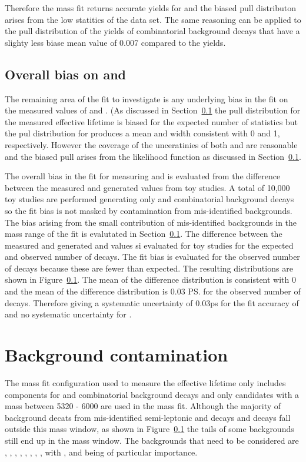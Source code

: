Therefore the mass fit returns accurate yields for \bsmumu and the biased pull distributon arises from the low statitics of the data set. The same reasoning can be applied to the pull distribution of the yields of combinatorial background decays that have a slighty less biase mean value of 0.007 compared to the \bsmumu yields.

\subsection{Overall bias on \tmumu and \Gmumu}
The remaining area of the fit to investigate is any underlying bias in the fit on the measured values of \tmumu and \Gmumu. (As discussed in Section~\ref{} the pull distribution for the measured effective lifetime is biased for the expected number of statistics but the pul distribution for \Gmumu produces a mean and width consistent with 0 and 1, respectively. However the coverage of the unceratinies of both \mmumu and \Gmumu are reasonable and the biased \tmumu pull arises from the likelihood function as discussed in Section~\ref{}. 

The overall bias in the fit for measuring \tmumu and \Gmumu is evaluated from the difference between the measured and generated values from toy studies. A total of 10,000 toy studies are performed generating only \bsmumu and combinatorial background decays so the fit bias is not masked by contamination from mis-identified backgrounds.  The bias arising from the small contribution of mis-identified backgrounds in the mass range of the fit is evalutated in Section~\ref{}. The difference between the measured and generated \tmumu and \Gmumu values si evaluated for toy studies for the expected and observed number of \bsmumu decays. The fit bias is evaluated for the observed number of decays because these are fewer than expected. The resulting distributions are shown in Figure~\ref{}. The mean of the \Gmumu difference distribution is consistent with 0 and the mean of the \tmumu difference distribution is 0.03 \ps for the observed number of decays.  Therefore giving a systematic uncertainty of 0.03ps for the fit accuracy of \tmumu and no systematic uncertainty for \Gmumu.

\section{Background contamination}
\label{sec:BKGcontaim}
The mass fit configuration used to measure the \bsmumu effective lifetime only includes components for \bsmumu and combinatorial background decays and only candidates with a \bs mass between 5320 - 6000 \mevcc are used in the mass fit. Although the majority of background decats from mis-identified semi-leptonic and \bhh decays and \bdmumu decays fall outside this mass window, as shown in Figure~\ref{} the tails of some backgrounds still end up in the mass window. The backgrounds that need to be considered are \bdmumu, \bhh, \lambdab, \bdpimunu, \bsKmunu, \bupimumu, \bdpimumu, \bcjpsimunu, with \bhh, \bdmumu and \lambda being of particular importance. 

